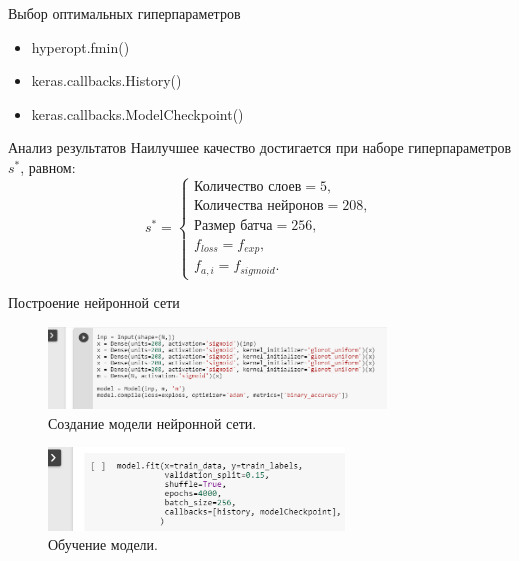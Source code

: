 \documentclass{beamer}
\begin{document}
\begin{frame}{Выбор оптимальных гиперпараметров}
\begin{block}{}
\begin{itemize}
  \item hyperopt.fmin()
  \item keras.callbacks.History()
  \item keras.callbacks.ModelCheckpoint()
\end{itemize}
\end{block}

\pause
\begin{block}{Анализ результатов}
Наилучшее качество достигается при наборе гиперпараметров $s^*$, равном:
$$ s^* = \begin{cases} \mbox{Количество слоев} = 5, \\ \mbox{Количества нейронов} = 208, \\ \mbox{Размер батча} = 256, \\ f_{loss} = f_{exp}, \\ f_{a,i} = f_{sigmoid}. \end{cases}$$
\end{block}
\end{frame}






\begin{frame}{Построение нейронной сети}
\begin{figure}[h]
    \centering
    \includegraphics[width=0.8\textwidth]{neural_network_create.png}
    \caption{Создание модели нейронной сети.}
    \label{fig:neural_network_create}
\end{figure}


\begin{figure}[h]
    \centering
    \includegraphics[width=0.7\textwidth]{neural_network_fit.png}
    \caption{Обучение модели.}
    \label{fig:neural_network_fir}
\end{figure}
\end{frame}
\end{document}
